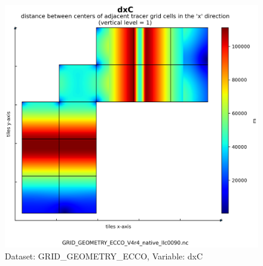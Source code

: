 \begin{figure}[H]
\centering
\includegraphics[scale=0.55]{../images/plots/native_plots_coords/Geometry_Parameters_for_the_Lat-Lon-Cap_90_(llc90)_Native_Model_Grid_(Version_4_Release_4)/dxC.png}
\caption{Dataset: GRID\_GEOMETRY\_ECCO, Variable: dxC}
\label{tab:table-GRID_GEOMETRY_ECCO_dxC-Plot}
\end{figure}
\newpage
\pagebreak
